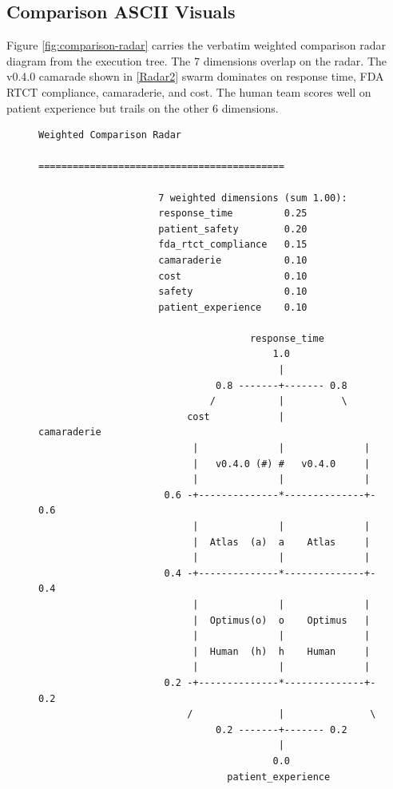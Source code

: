 \begin{sectionaccent}
\subsection{Comparison ASCII Visuals}
\label{sec:results-visuals}

Figure \ref{fig:comparison-radar} carries the verbatim weighted
comparison radar diagram from the execution tree. The 7 dimensions
overlap on the radar. The v0.4.0 camarade shown in \autoref{Radar2} swarm dominates on
response time, FDA RTCT compliance, camaraderie, and cost. The human
team scores well on patient experience but trails on the other 6
dimensions.

\begin{figure}[H]
\vspace{-0.15cm}
\centering
\begin{Verbatim}[fontsize=\small]
                                 Weighted Comparison Radar
                     ===========================================

                     7 weighted dimensions (sum 1.00):
                     response_time         0.25
                     patient_safety        0.20
                     fda_rtct_compliance   0.15
                     camaraderie           0.10
                     cost                  0.10
                     safety                0.10
                     patient_experience    0.10

                                     response_time
                                         1.0
                                          |
                               0.8 -------+------- 0.8
                              /           |          \
                          cost            |           camaraderie
                           |              |              |
                           |   v0.4.0 (#) #   v0.4.0     |
                           |              |              |
                      0.6 -+--------------*--------------+- 0.6
                           |              |              |
                           |  Atlas  (a)  a    Atlas     |
                           |              |              |
                      0.4 -+--------------*--------------+- 0.4
                           |              |              |
                           |  Optimus(o)  o    Optimus   |
                           |              |              |
                           |  Human  (h)  h    Human     |
                           |              |              |
                      0.2 -+--------------*--------------+- 0.2
                          /               |               \
                               0.2 -------+------- 0.2
                                          |
                                         0.0
                                 patient_experience


\end{Verbatim}
\end{figure}
\end{sectionaccent}
